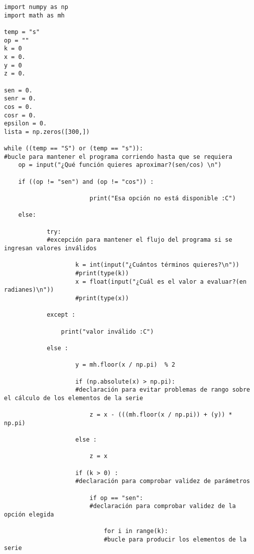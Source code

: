 \documentclass[12pt,a4paper]{article}
\begin{document}
\begin{verbatim}
import numpy as np
import math as mh

temp = "s"
op = ""
k = 0
x = 0.
y = 0
z = 0.

sen = 0.
senr = 0.
cos = 0.
cosr = 0.
epsilon = 0.
lista = np.zeros([300,])

while ((temp == "S") or (temp == "s")):
#bucle para mantener el programa corriendo hasta que se requiera
    op = input("¿Qué función quieres aproximar?(sen/cos) \n")
    
    if ((op != "sen") and (op != "cos")) :
                        
                        print("Esa opción no está disponible :C")
                
    else:
        
            try:
            #excepción para mantener el flujo del programa si se ingresan valores inválidos
            
                    k = int(input("¿Cuántos términos quieres?\n"))
                    #print(type(k))
                    x = float(input("¿Cuál es el valor a evaluar?(en radianes)\n"))
                    #print(type(x))
            
            except :
            
                print("valor inválido :C")
            
            else : 
            
                    y = mh.floor(x / np.pi)  % 2
                
                    if (np.absolute(x) > np.pi):
                    #declaración para evitar problemas de rango sobre el cálculo de los elementos de la serie 
                
                        z = x - (((mh.floor(x / np.pi)) + (y)) * np.pi)
                    
                    else :
                        
                        z = x
                    
                    if (k > 0) :
                    #declaración para comprobar validez de parámetros
                
                        if op == "sen":
                        #declaración para comprobar validez de la opción elegida
                    
                            for i in range(k):
                            #bucle para producir los elementos de la serie
                    

\end{verbatim}
\end{document}

